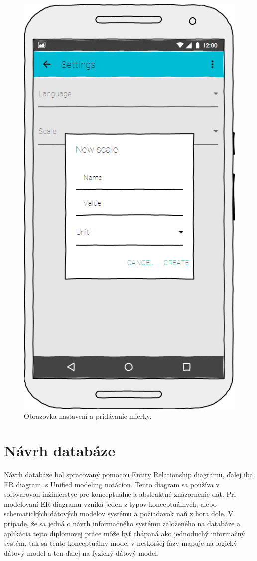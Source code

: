 \begin{figure}[h]
   \begin {minipage}{0.48\textwidth}
     \centering
     \includegraphics[scale=0.45]{fig/mockup3.png}
      \caption{Obrazovka nastavení a pridávanie mierky.}
      \label{fig:mockup3}
   \end{minipage}
\end{figure}
\newpage

\section{Návrh databáze}
Návrh databáze bol spracovaný pomocou Entity Relationship diagramu, ďalej iba ER diagram, s Unified modeling notáciou. Tento diagram sa používa v softwarovon inžinierstve pre konceptuálne a abstraktné znázornenie dát. Pri modelovaní ER diagramu vzniká jeden z typov konceptuálnych, alebo schematických dátových modelov systému a požiadavok naň z hora dole. V prípade, že sa jedná o návrh informačného systému založeného na databáze a aplikácia tejto diplomovej práce môže byť chápaná ako jednoduchý informačný systém, tak sa tento konceptuálny model v neskoršej fázy mapuje na logický dátový model a ten ďalej na fyzický dátový model.

